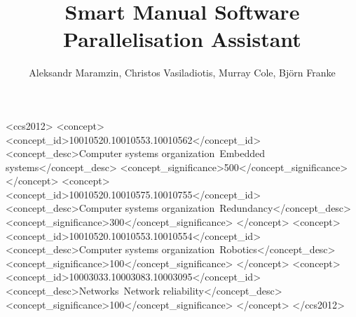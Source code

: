 \documentclass[sigconf,10pt,review,anonymous]{acmart}
\begin{document}
\title{Smart Manual Software Parallelisation Assistant}

\author{Aleksandr Maramzin, Christos Vasiladiotis, Murray Cole, Bj\"orn Franke}

%
%
\begin{CCSXML}
<ccs2012>
 <concept>
  <concept_id>10010520.10010553.10010562</concept_id>
  <concept_desc>Computer systems organization~Embedded systems</concept_desc>
  <concept_significance>500</concept_significance>
 </concept>
 <concept>
  <concept_id>10010520.10010575.10010755</concept_id>
  <concept_desc>Computer systems organization~Redundancy</concept_desc>
  <concept_significance>300</concept_significance>
 </concept>
 <concept>
  <concept_id>10010520.10010553.10010554</concept_id>
  <concept_desc>Computer systems organization~Robotics</concept_desc>
  <concept_significance>100</concept_significance>
 </concept>
 <concept>
  <concept_id>10003033.10003083.10003095</concept_id>
  <concept_desc>Networks~Network reliability</concept_desc>
  <concept_significance>100</concept_significance>
 </concept>
</ccs2012>
\end{CCSXML}

\end{document}
